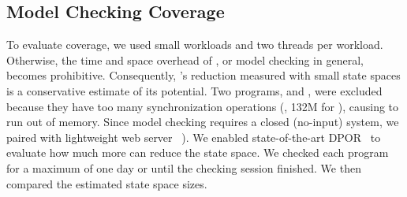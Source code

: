 
\subsection{Model Checking Coverage} \label{sec:parrot-coverage}




To evaluate coverage, we used small workloads and two threads per workload.
Otherwise, the time and space overhead of \dbug,
or model checking in general, becomes prohibitive. Consequently, \parrot's
reduction measured with small state spaces is a conservative estimate of
its potential.  Two programs, \volrend and \ua, were excluded because they
have too many synchronization operations (\eg, 132M for \ua), causing
\dbug to run out of memory.  Since model checking requires a closed
(no-input) system, we paired \aget with lightweight web server
\mongoose~\cite{mongoose}).  We enabled
state-of-the-art DPOR~\cite{flanagan:dynamicpo} to evaluate how much more
\parrot can reduce the state space. We checked each program for a maximum of
one day or until the checking session finished.  We then compared the
estimated state space sizes.

